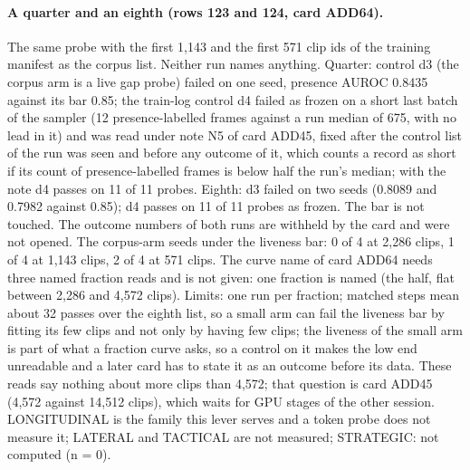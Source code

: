 \paragraph{A quarter and an eighth (rows 123 and 124, card ADD64).} The same probe with the first 1,143 and the first 571 clip ids of the training manifest as the corpus list. Neither run names anything. Quarter: control d3 (the corpus arm is a live gap probe) failed on one seed, presence AUROC 0.8435 against its bar 0.85; the train-log control d4 failed as frozen on a short last batch of the sampler (12 presence-labelled frames against a run median of 675, with no lead in it) and was read under note N5 of card ADD45, fixed after the control list of the run was seen and before any outcome of it, which counts a record as short if its count of presence-labelled frames is below half the run's median; with the note d4 passes on 11 of 11 probes. Eighth: d3 failed on two seeds (0.8089 and 0.7982 against 0.85); d4 passes on 11 of 11 probes as frozen. The bar is not touched. The outcome numbers of both runs are withheld by the card and were not opened. The corpus-arm seeds under the liveness bar: 0 of 4 at 2,286 clips, 1 of 4 at 1,143 clips, 2 of 4 at 571 clips. The curve name of card ADD64 needs three named fraction reads and is not given: one fraction is named (the half, flat between 2,286 and 4,572 clips). Limits: one run per fraction; matched steps mean about 32 passes over the eighth list, so a small arm can fail the liveness bar by fitting its few clips and not only by having few clips; the liveness of the small arm is part of what a fraction curve asks, so a control on it makes the low end unreadable and a later card has to state it as an outcome before its data. These reads say nothing about more clips than 4,572; that question is card ADD45 (4,572 against 14,512 clips), which waits for GPU stages of the other session. LONGITUDINAL is the family this lever serves and a token probe does not measure it; LATERAL and TACTICAL are not measured; STRATEGIC: not computed (n = 0).
